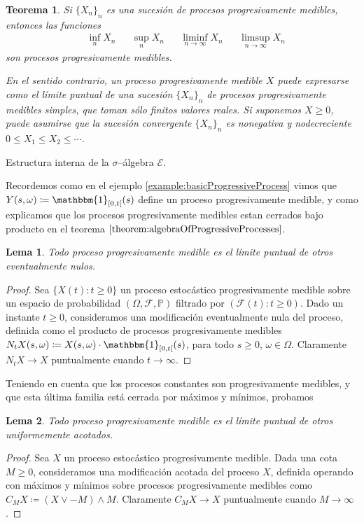\documentclass{report}
\newcommand{\leftOpenInterval}{\left]}
\newcommand{\rightOpenInterval}{\right[}
\newcommand{\leftClosedInterval}{\left[}
\newcommand{\rightClosedInterval}{\right]}
\newcommand{\interval}[3]{%
    \ifstrequal{#1}{oo}{%
      \leftOpenInterval #2, #3 \rightOpenInterval%
    }{%
      \ifstrequal{#1}{co}{%
        \leftClosedInterval #2, #3 \rightOpenInterval%
      }{%
        \ifstrequal{#1}{oc}{
          \leftOpenInterval #2, #3 \rightClosedInterval%
        }{%
          \ifstrequal{#1}{cc}{
            \leftClosedInterval #2, #3 \rightClosedInterval
          }{%
          }%
        }%
      }%
    }%
  }
\newcommand{\characteristic}{\mathbbm{1}}
\newcommand{\prob}{\mathbb{P}}
\newcommand{\events}{\mathcal{F}}
\newcommand{\progressiveAlgebra}{\mathscr{E}}
\theoremstyle{plain}
\newtheorem{theorem}{Teorema}
\newtheorem{lemma}{Lema}
\theoremstyle{remark}
\theoremstyle{definition}
\begin{document}
\begin{theorem}
  Si \(\{X_n\}_n\) es una sucesión de procesos progresivamente medibles, entonces las funciones 
  \begin{align}
    & \inf_n X_n
    &&  \sup_n X_n
    &&  \liminf_{n \rightarrow \infty} X_n
    &&  \limsup_{n \rightarrow \infty} X_n
  \end{align}
  son procesos progresivamente medibles.

  En el sentido contrario, un proceso progresivamente medible \(X\) puede expresarse como el límite puntual de una sucesión \(\{X_n\}_n\) de procesos progresivamente medibles simples, que toman sólo finitos valores reales.
  Si suponemos \(X \geq 0\), puede asumirse que la sucesión convergente \(\{X_n\}_n\) es nonegativa y nodecreciente \(0 \leq X_1 \leq X_2 \leq \cdots\).
\end{theorem}

Estructura interna de la \(\sigma\)--álgebra \(\progressiveAlgebra\).

Recordemos como en el ejemplo \ref{example:basicProgressiveProcess} vimos que \(Y(s, \omega) \coloneqq \characteristic_{\interval{co}{0}{t}}(s)\) define un proceso progresivamente medible, y como explicamos que los procesos progresivamente medibles estan cerrados bajo producto en el teorema \(\ref{theorem:algebraOfProgressiveProcesses}\).

\begin{lemma}
  Todo proceso progresivamente medible es el límite puntual de otros eventualmente nulos.
\end{lemma}
\begin{proof}
  Sea \(\{X(t) : t \geq 0\}\) un proceso estocástico progresivamente medible sobre un espacio de probabilidad \((\Omega, \events, \prob)\) filtrado por \((\events(t) : t \geq 0)\).
  Dado un instante \(t \geq 0\), consideramos una modificación eventualmente nula del proceso, definida como el producto de procesos progresivamente medibles \(N_t X (s, \omega) \coloneqq X(s, \omega) \cdot \characteristic_{[0, t[} (s)\), para todo \(s \geq 0\), \(\omega \in \Omega\).
  Claramente \(N_t X \rightarrow X\) puntualmente cuando \(t \rightarrow \infty\).
\end{proof}

Teniendo en cuenta que los procesos constantes son progresivamente medibles, y que esta última familia está cerrada por máximos y mínimos, probamos
\begin{lemma}
  Todo proceso progresivamente medible es el límite puntual de otros uniformemente acotados.
\end{lemma}
\begin{proof}
  Sea \(X\) un proceso estocástico progresivamente medible.
  Dada una cota \(M \geq 0\), consideramos una modificación acotada del proceso \(X\), definida operando con máximos y mínimos sobre procesos progresivamente medibles como \(C_M X \coloneqq (X \vee - M) \wedge M\).
  Claramente \(C_M X \rightarrow X\) puntualmente cuando \(M \rightarrow \infty\).
\end{proof}
\end{document}
